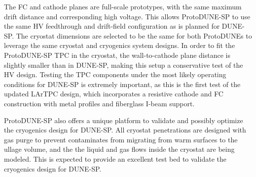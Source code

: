 {%

The FC and cathode planes are full-scale prototypes, 
with the same maximum drift distance and corresponding high voltage.
This allows ProtoDUNE-SP to use the same HV feedthrough and drift-field configuration as is planned for DUNE-SP. The cryostat dimensions are selected to be the same for both ProtoDUNEs %
to leverage the same cryostat and cryogenics system designs. 
In order to fit the ProtoDUNE-SP TPC in the cryostat, the wall-to-cathode plane distance is slightly smaller than in DUNE-SP, making this setup a conservative test of the HV design. 
Testing the TPC components under the most likely operating conditions for DUNE-SP is extremely important, as this is the first test of the updated LArTPC design, which incorporates a resistive cathode 
and FC construction with metal profiles and fiberglass I-beam support. 

ProtoDUNE-SP also offers a unique platform to validate and possibly optimize the cryogenics design for DUNE-SP. 
All cryostat penetrations are designed with gas purge to prevent contaminates from migrating from warm surfaces to the ullage volume, and the the liquid and gas flows inside the cryostat are being modeled. This is expected to provide an excellent test bed to validate the cryogenics design for DUNE-SP. 

}
